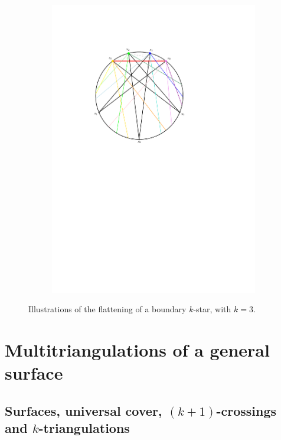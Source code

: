 \documentclass{amsart}
\theoremstyle{remark}
\begin{document}
\begin{figure}
\begin{subfigure}[b]{.48\textwidth}
    \includegraphics[width=\textwidth,page=2]{exFlattening}
  \end{subfigure}
  \caption{Illustrations of the flattening of a boundary $k$-star, with $k=3$.}
  \label{fig:exProofStar}
\end{figure}


\section{Multitriangulations of a general surface}
\label{sec:multitriangulationsSurfaces}
 

\subsection{Surfaces, universal cover, $(k+1)$-crossings and $k$-triangulations}
\end{document}
